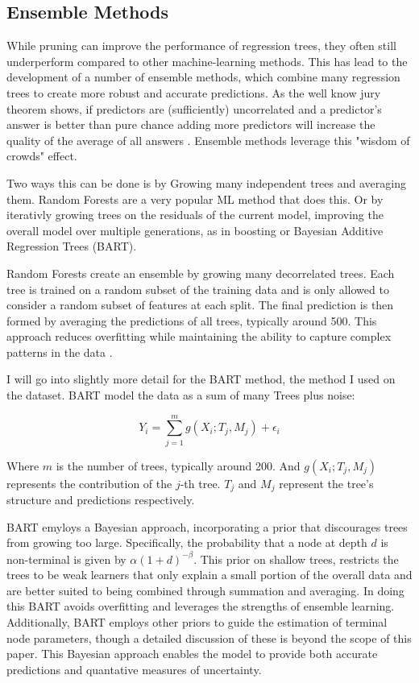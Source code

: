 \documentclass[12pt]{article}
\begin{document}
\subsection{Ensemble Methods}
While pruning can improve the performance of regression trees, they often still underperform compared to other machine-learning methods. This has lead to the development of a number of ensemble methods, which combine many regression trees to create more robust and accurate predictions. As the well know jury theorem shows, if predictors are (sufficiently) uncorrelated and a predictor's answer is better than pure chance adding more predictors will increase the quality of the average of all answers \citep{condorcet1785}. Ensemble methods leverage this "wisdom of crowds" effect.

Two ways this can be done is by Growing many independent trees and averaging them. Random Forests are a very popular ML method that does this. Or by iterativly growing trees on the residuals of the current model, improving the overall model over multiple generations, as in boosting or Bayesian Additive Regression Trees (BART).

Random Forests create an ensemble by growing many decorrelated trees. Each tree is trained on a random subset of the training data and is only allowed to consider a random subset of features at each split. The final prediction is then formed by averaging the predictions of all trees, typically around 500. This approach reduces overfitting while maintaining the ability to capture complex patterns in the data \citep{biau2016}.

I will go into slightly more detail for the BART method, the method I used on the dataset. BART model the data as a sum of many Trees plus noise:

\begin{equation}
    Y_i = \sum_{j=1}^{m} g(X_i; T_j, M_j) + \epsilon_i
\end{equation}

Where $m$ is the number of trees, typically around 200. And $g(X_i; T_j, M_j)$ represents the contribution of the $j$-th tree. $T_j$ and $M_j$ represent the tree's structure and predictions respectively.

BART emyloys a Bayesian approach, incorporating a prior that discourages trees from growing too large. Specifically, the probability that a node at depth $d$ is non-terminal is given by $\alpha(1 + d)^{-\beta}$. This prior on shallow trees, restricts the trees to be weak learners that only explain a small portion of the overall data and are better suited to being combined through summation and averaging. In doing this BART avoids overfitting and leverages the strengths of ensemble learning. Additionally, BART employs other priors to guide the estimation of terminal node parameters, though a detailed discussion of these is beyond the scope of this paper. This Bayesian approach enables the model to provide both accurate predictions and quantative measures of uncertainty.
\end{document}
